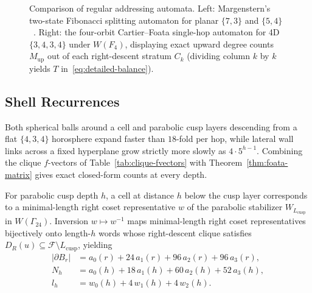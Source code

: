 \begin{figure}[tb]
\caption{Comparison of regular addressing automata. Left: Margenstern's two-state Fibonacci splitting automaton for planar $\{7,3\}$ and $\{5,4\}$~\cite{margenstern2016coords}. Right: the four-orbit Cartier--Foata single-hop automaton for 4D $\{3,4,3,4\}$ under $W(F_4)$, displaying exact upward degree counts $M_{\mathrm{up}}$ out of each right-descent stratum $C_k$ (dividing column $k$ by $k$ yields $T$ in~\eqref{eq:detailed-balance}).}
\label{fig:automaton}
\end{figure}

\subsection{Shell Recurrences}
\label{subsec:shell-recurrences}

Both spherical balls around a cell and parabolic cusp layers descending from a flat $\{4,3,4\}$ horosphere expand faster than $18$-fold per hop, while lateral wall links across a fixed hyperplane grow strictly more slowly as $4 \cdot 5^{h-1}$. Combining the clique $f$-vectors of Table~\ref{tab:clique-fvectors} with Theorem~\ref{thm:foata-matrix} gives exact closed-form counts at every depth.

For parabolic cusp depth $h$, a cell at distance $h$ below the cusp layer corresponds to a minimal-length right coset representative $w$ of the parabolic stabilizer $W_{L_{\mathrm{cusp}}}$ in $W(\Gamma_{24})$. Inversion $w \mapsto w^{-1}$ maps minimal-length right coset representatives bijectively onto length-$h$ words whose right-descent clique satisfies $D_R(u) \subseteq \mathcal{F} \setminus L_{\mathrm{cusp}}$, yielding
\begin{align}
|\partial B_r| &= a_0(r) + 24\,a_1(r) + 96\,a_2(r) + 96\,a_3(r), \label{eq:ball-shell}\\
N_h &= a_0(h) + 18\,a_1(h) + 60\,a_2(h) + 52\,a_3(h), \label{eq:cusp-shell}\\
l_h &= w_0(h) + 4\,w_1(h) + 4\,w_2(h). \label{eq:wall-cusp}
\end{align}

